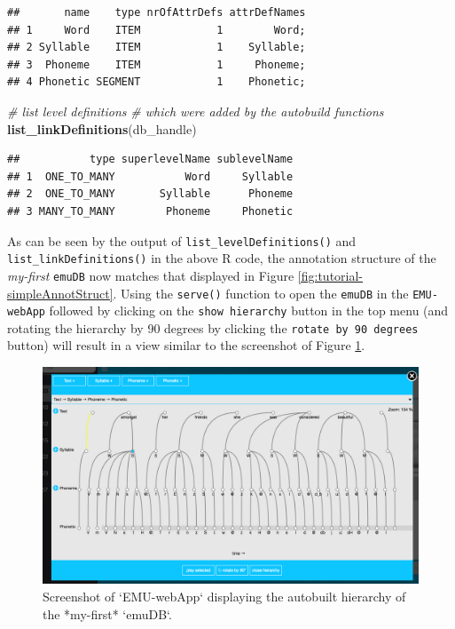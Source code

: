 \documentclass[]{book}
\newenvironment{Shaded}{\begin{snugshade}}{\end{snugshade}}
\newcommand{\CommentTok}[1]{\textcolor[rgb]{0.56,0.35,0.01}{\textit{#1}}}
\newcommand{\KeywordTok}[1]{\textcolor[rgb]{0.13,0.29,0.53}{\textbf{#1}}}
\newcommand{\NormalTok}[1]{#1}
\begin{document}
\begin{verbatim}
##       name    type nrOfAttrDefs attrDefNames
## 1     Word    ITEM            1        Word;
## 2 Syllable    ITEM            1    Syllable;
## 3  Phoneme    ITEM            1     Phoneme;
## 4 Phonetic SEGMENT            1    Phonetic;
\end{verbatim}

\begin{Shaded}
\begin{Highlighting}[]
\CommentTok{# list level definitions}
\CommentTok{# which were added by the autobuild functions}
\KeywordTok{list_linkDefinitions}\NormalTok{(db_handle)}
\end{Highlighting}
\end{Shaded}

\begin{verbatim}
##           type superlevelName sublevelName
## 1  ONE_TO_MANY           Word     Syllable
## 2  ONE_TO_MANY       Syllable      Phoneme
## 3 MANY_TO_MANY        Phoneme     Phonetic
\end{verbatim}

As can be seen by the output of \texttt{list\_levelDefinitions()} and \texttt{list\_linkDefinitions()} in the above R code, the annotation structure of the \emph{my-first} \texttt{emuDB} now matches that displayed in Figure \ref{fig:tutorial-simpleAnnotStruct}. Using the \texttt{serve()} function to open the \texttt{emuDB} in the \texttt{EMU-webApp} followed by clicking on the \texttt{show\ hierarchy} button in the top menu (and rotating the hierarchy by 90 degrees by clicking the \texttt{rotate\ by\ 90\ degrees} button) will result in a view similar to the screenshot of Figure \ref{fig:tutorial-EMU-webAppScreenshotTutorialPostAutobHier}.

\begin{figure}

{\centering \includegraphics[width=1\linewidth]{pics/EMU-webAppScreenshotTutorialPostAutobHier} 

}

\caption{Screenshot of `EMU-webApp` displaying the autobuilt hierarchy of the *my-first* `emuDB`.}\label{fig:tutorial-EMU-webAppScreenshotTutorialPostAutobHier}
\end{figure}
\end{document}
